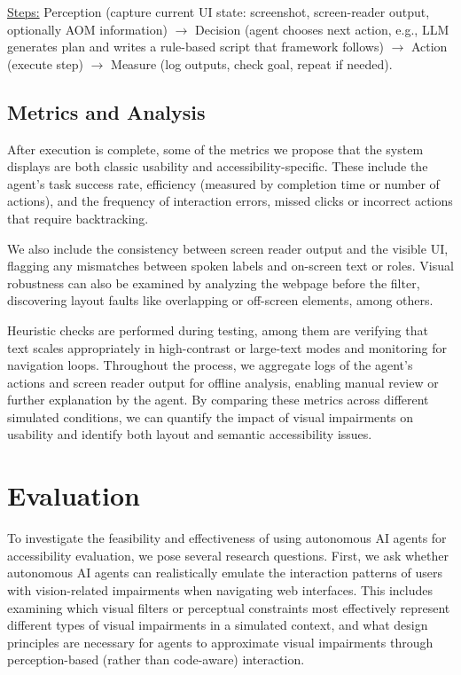\underline{Steps:} Perception (capture current \ac{UI} state: screenshot, screen-reader output, optionally \ac{AOM} information) $\rightarrow$ Decision (agent chooses next action, e.g., LLM generates plan and writes a rule-based script that framework follows) $\rightarrow$ Action (execute step) $\rightarrow$ Measure (log outputs, check goal, repeat if needed).


\subsection{Metrics and Analysis}


After execution is complete, some of the metrics we propose that the system displays are both classic usability and accessibility-specific. These include the agent's task success rate, efficiency (measured by completion time or number of actions), and the frequency of interaction errors, missed clicks or incorrect actions that require backtracking. 

We also include the consistency between screen reader output and the visible \ac{UI}, flagging any mismatches between spoken labels and on-screen text or roles. Visual robustness can also be examined by analyzing the webpage before the filter, discovering layout faults like overlapping or off-screen elements, among others. 

Heuristic checks are performed during testing, among them are verifying that text scales appropriately in high-contrast or large-text modes and monitoring for navigation loops. Throughout the process, we aggregate logs of the agent's actions and screen reader output for offline analysis, enabling manual review or further explanation by the agent. By comparing these metrics across different simulated conditions, we can quantify the impact of visual impairments on usability and identify both layout and semantic accessibility issues.

\section{Evaluation}

To investigate the feasibility and effectiveness of using autonomous AI agents for accessibility evaluation, we pose several research questions. First, we ask whether autonomous AI agents can realistically emulate the interaction patterns of users with vision-related impairments when navigating web interfaces. This includes examining which visual filters or perceptual constraints most effectively represent different types of visual impairments in a simulated context, and what design principles are necessary for agents to approximate visual impairments through perception-based (rather than code-aware) interaction.

